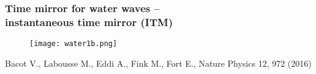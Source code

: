 \documentclass{beamer}
\begin{document}

\begin{frame}%
  \frametitle{Time mirror for water waves -- \\instantaneous time mirror (ITM)}
      \begin{figure}\centering
       \texttt{[image: water1b.png]}
      \end{figure}
  \vspace{\fill}
  {\footnotesize \alert{Bacot V., Labousse M., Eddi A., Fink M., Fort E.}, Nature Physics 12, 972 (2016)}
  \end{frame}
  
\end{document}
